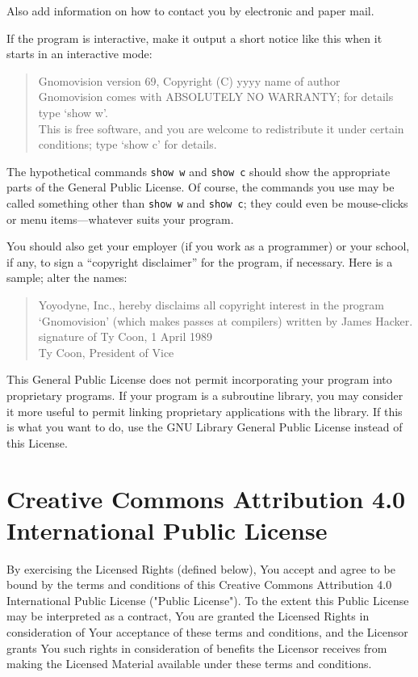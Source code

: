 \documentclass[12pt,a4paper]{article}
\begin{document}
Also add information on how to contact you by electronic and paper mail.

If the program is interactive, make it output a short notice like this
when it starts in an interactive mode:

\begin{quote}
Gnomovision version 69, Copyright (C) yyyy  name of author \\
Gnomovision comes with ABSOLUTELY NO WARRANTY; for details type `show w'. \\
This is free software, and you are welcome to redistribute it
under certain conditions; type `show c' for details.
\end{quote}


The hypothetical commands {\tt show w} and {\tt show c} should show the
appropriate parts of the General Public License.  Of course, the commands
you use may be called something other than {\tt show w} and {\tt show c};
they could even be mouse-clicks or menu items---whatever suits your
program.

You should also get your employer (if you work as a programmer) or your
school, if any, to sign a ``copyright disclaimer'' for the program, if
necessary.  Here is a sample; alter the names:

\begin{quote}
Yoyodyne, Inc., hereby disclaims all copyright interest in the program \\
`Gnomovision' (which makes passes at compilers) written by James Hacker. \\

signature of Ty Coon, 1 April 1989 \\
Ty Coon, President of Vice
\end{quote}


This General Public License does not permit incorporating your program
into proprietary programs.  If your program is a subroutine library, you
may consider it more useful to permit linking proprietary applications
with the library.  If this is what you want to do, use the GNU Library
General Public License instead of this License.


\section{Creative Commons Attribution 4.0 International Public License}
\label{appCCBY4}
\setlength{\parindent}{0cm}
\setlength{\parskip}{0cm}
\setlength{\itemsep}{0cm}
\small

By exercising the Licensed Rights (defined below), You accept and agree to be bound by the terms and conditions of this Creative Commons Attribution 4.0 International Public License ("Public License"). To the extent this Public License may be interpreted as a contract, You are granted the Licensed Rights in consideration of Your acceptance of these terms and conditions, and the Licensor grants You such rights in consideration of benefits the Licensor receives from making the Licensed Material available under these terms and conditions.
\end{document}
